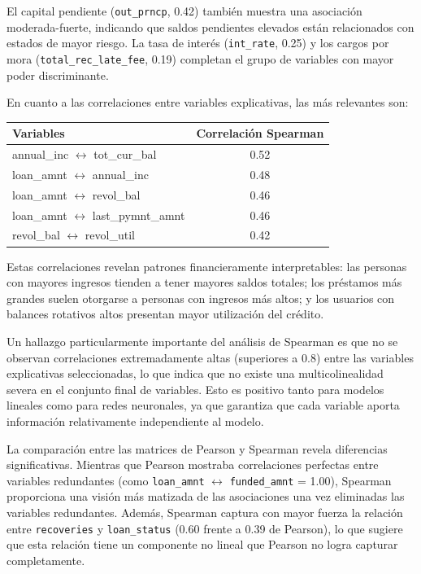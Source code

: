\documentclass[12pt,a4paper]{article}
\begin{document}
El capital pendiente (\texttt{out\_prncp}, 0.42) también muestra una asociación moderada-fuerte, indicando que saldos pendientes elevados están relacionados con estados de mayor riesgo. La tasa de interés (\texttt{int\_rate}, 0.25) y los cargos por mora (\texttt{total\_rec\_late\_fee}, 0.19) completan el grupo de variables con mayor poder discriminante.

En cuanto a las correlaciones entre variables explicativas, las más relevantes son:

\begin{center}
\begin{tabular}{lc}
\toprule
Variables & Correlación Spearman \\
\midrule
annual\_inc \(\leftrightarrow\) tot\_cur\_bal & 0.52 \\
loan\_amnt \(\leftrightarrow\) annual\_inc    & 0.48 \\
loan\_amnt \(\leftrightarrow\) revol\_bal    & 0.46 \\
loan\_amnt \(\leftrightarrow\) last\_pymnt\_amnt & 0.46 \\
revol\_bal \(\leftrightarrow\) revol\_util   & 0.42 \\
\bottomrule
\end{tabular}
\end{center}

Estas correlaciones revelan patrones financieramente interpretables: las personas con mayores ingresos tienden a tener mayores saldos totales; los préstamos más grandes suelen otorgarse a personas con ingresos más altos; y los usuarios con balances rotativos altos presentan mayor utilización del crédito.

Un hallazgo particularmente importante del análisis de Spearman es que no se observan correlaciones extremadamente altas (superiores a 0.8) entre las variables explicativas seleccionadas, lo que indica que no existe una multicolinealidad severa en el conjunto final de variables. Esto es positivo tanto para modelos lineales como para redes neuronales, ya que garantiza que cada variable aporta información relativamente independiente al modelo.

La comparación entre las matrices de Pearson y Spearman revela diferencias significativas. Mientras que Pearson mostraba correlaciones perfectas entre variables redundantes (como \texttt{loan\_amnt} \(\leftrightarrow\) \texttt{funded\_amnt} = 1.00), Spearman proporciona una visión más matizada de las asociaciones una vez eliminadas las variables redundantes. Además, Spearman captura con mayor fuerza la relación entre \texttt{recoveries} y \texttt{loan\_status} (0.60 frente a 0.39 de Pearson), lo que sugiere que esta relación tiene un componente no lineal que Pearson no logra capturar completamente.
\end{document}
